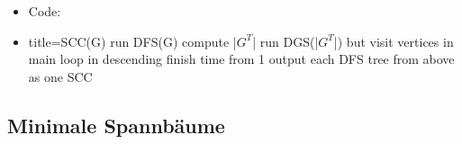 \documentclass[
    12pt,
    a4paper,
    ngerman,
    color=3b,%
    marginpar=false,
    colorback=false,
    leqno,
]{tudaexercise}
\begin{document}
\begin{itemize}
\begin{itemize}
\begin{itemize}
                        \item Code:
                        \item[]
                            \begin{ccode}[autogobble,escapeinside=||]{title={SCC(G)}}
                            run DFS(G)
                            compute |$G^T$|
                            run DGS(|$G^T$|) but visit vertices in main loop
                                in descending finish time from 1
                            output each DFS tree from above as one SCC
                            \end{ccode}
                    \end{itemize}
            \end{itemize}
    \end{itemize}
\clearpage
\subsection{Minimale Spannbäume}
\end{document}
